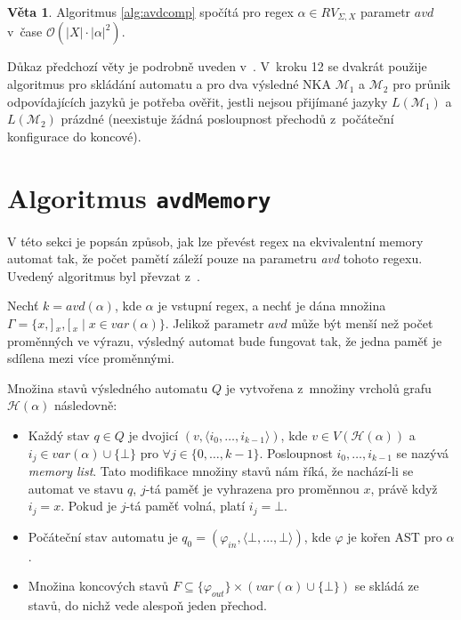 \documentclass[thesis=B,czech]{FITthesis}[2019/12/23]
\theoremstyle{definition}
\newtheorem{theorem}{Věta}[chapter]
\begin{document}
\begin{theorem}\label{avdcomp}Algoritmus \ref{alg:avdcomp} spočítá pro regex $\alpha \in RV_{\Sigma, X}$ parametr $avd$ v~čase $\mathcal{O}(|X|\cdot|\alpha|^2)$. \cite{schmidref}
\end{theorem}
Důkaz předchozí věty je podrobně uveden v~\cite[s. 7]{schmidref}. V~kroku 12 se dvakrát použije algoritmus pro skládání automatu \cite[s. 54--56]{sestakova} a pro dva výsledné NKA $\mathcal{M}_1$ a $\mathcal{M}_2$ pro průnik odpovídajících jazyků je potřeba ověřit, jestli nejsou přijímané jazyky $L(\mathcal{M}_1)$ a $L(\mathcal{M}_2)$ prázdné (neexistuje žádná posloupnost přechodů z~počáteční konfigurace do koncové).

\section{Algoritmus \texttt{avdMemory}}

V této sekci je popsán způsob, jak lze převést regex na ekvivalentní memory automat tak, že počet pamětí záleží pouze na parametru \emph{avd} tohoto regexu. 
Uvedený algoritmus byl převzat z~\cite[kapitola 3]{schmidref}.

Nechť $k=avd(\alpha)$, kde $\alpha$ je vstupní regex, a nechť je dána množina $\Gamma = \{x, ]\,_x, [\,_x \mid x \in var(\alpha)\}$. Jelikož parametr $avd$ může být menší než počet proměnných ve výrazu, výsledný automat bude fungovat tak, že jedna paměť je sdílena mezi více proměnnými. 

Množina stavů výsledného automatu $Q$ je vytvořena z~množiny vrcholů grafu $\mathcal{H}(\alpha)$ následovně:
\begin{itemize}
	\item Každý stav $q \in Q$ je dvojicí $(v, \langle i_0, \dots, i_{k-1}  \rangle)$, kde $v \in V(\mathcal{H}(\alpha))$ a ${i_j \in var(\alpha) \cup \{\bot\}}$ pro $\forall j \in \{0, \dots, k-1\}$. Posloupnost $ i_0, \dots, i_{k-1}$ se nazývá \emph{memory list}. Tato modifikace množiny stavů nám říká, že nachází-li se automat ve stavu $q$, $j$-tá paměť je vyhrazena pro proměnnou $x$, právě když $i_j = x$. Pokud je $j$-tá paměť volná, platí $i_j = \bot$.
	\item Počáteční stav automatu je $q_0 = (\varphi_{in}, \langle \bot, \dots, \bot \rangle)$, kde $\varphi$ je kořen AST pro $\alpha$.
	\item Množina koncových stavů $F \subseteq \{\varphi_{out}\} \times (var(\alpha) \cup \{\bot\})$ se skládá ze stavů, do nichž vede alespoň jeden přechod. 
\end{itemize}
\end{document}
